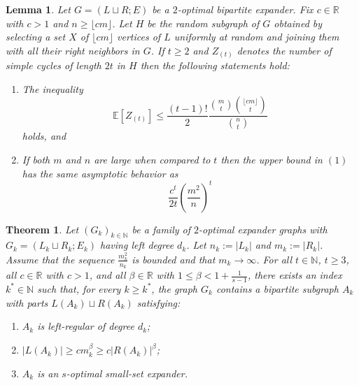\documentclass[10pt,a4paper]{amsart}
\newtheorem{theorem}{Theorem}
\newtheorem{lemma}{Lemma}
\newcommand{\EE}{\ensuremath{\mathbb{E}}}
\newcommand{\RR}{\ensuremath{\mathbb{R}}}
\renewcommand{\geq}{\geqslant}
\renewcommand{\leq}{\leqslant}
\begin{document}
\begin{lemma}\label{lem: expectedcycles} Let $G=(L\sqcup R ; E)$ be a $2$-optimal bipartite expander. Fix $c\in \RR$ with $c>1$ and $n\geq \lfloor cm\rfloor$. Let $H$ be the random subgraph of $G$ obtained by selecting a set $X$ of $\lfloor cm\rfloor$ vertices of $L$ uniformly at random and joining them with all their right neighbors in $G$. If $t\geq 2$ and $Z_{(t)}$ denotes the number of simple cycles of length $2t$ in $H$ then the following statements hold:
\begin{enumerate}
\item The inequality
\[\EE[Z_{(t)}]\leq \frac{(t-1)!}{2}\frac{\binom{m}{t}\binom{\lfloor cm\rfloor}{t}}{\binom{n}{t}}\]
holds, and
\item If both $m$ and $n$ are large when compared to $t$ then the upper bound in $(1)$ has the same asymptotic behavior as 
\[\frac{c^t}{2t}\left(\frac{m^2}{n}\right)^t\]
\end{enumerate}
\end{lemma}

\begin{theorem}\label{Thm: existance_nonlinear} Let $(G_k)_{k\in\mathbb{N}}$ be a family of $2$-optimal expander graphs with
$G_k = (L_k \sqcup R_k; E_k)$ having left degree $d_k$. Let $n_k := |L_k|$ and $m_k := |R_k|$. Assume that the sequence $\frac{m_k^2}{n_k}$ is bounded and that $m_k \to \infty$. For all $t \in \mathbb{N}$, $t \ge 3$, all $c \in \mathbb{R}$ with $c > 1$, and all
$\beta \in \RR$ with $1 \leq \beta < 1 + \frac{1}{s-1}$, there exists an index
$k^\ast \in \mathbb{N}$ such that, for every $k \ge k^\ast$, the graph $G_k$
contains a bipartite subgraph $A_k$ with parts
$L(A_k) \sqcup R(A_k)$ satisfying:
\begin{enumerate}
  \item $A_k$ is left-regular of degree $d_k$;
  \item $|L(A_k)| \ge c m_k^{\beta} \ge c |R(A_k)|^{\beta}$;
  \item $A_k$ is an $s$-optimal small-set expander.
\end{enumerate}
\end{theorem}
\end{document}
